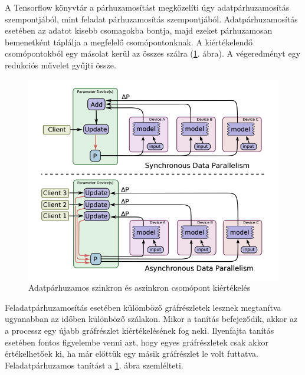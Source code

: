 \documentclass[12pt, a4paper, oneside]{book}
\theoremstyle{tetel}
\begin{document}
A Tensorflow könyvtár a párhuzamosítást megközelíti úgy adatpárhuzamosítás szempontjából, mint feladat párhuzamosítás szempontjából. Adatpárhuzamosítás esetében az adatot kisebb csomagokba bontja, majd ezeket párhuzamosan bemenetként táplálja a megfelelő csomópontonknak. A kiértékelendő csomópontokból egy másolat kerül az összes szálra (\ref{data_parallel_tf_model}. ábra). A végeredményt egy redukciós művelet gyűjti össze.

\begin{figure}[!htbp]
	\begin{center}
		\includegraphics[scale=0.5]{data_parallel_tf_model.png}
		\caption{Adatpárhuzamos szinkron és aszinkron csomópont kiértékelés\cite{35}}
		\label{data_parallel_tf_model}
	\end{center}
\end{figure}

Feladatpárhuzamosítás esetében külömböző gráfrészletek lesznek megtanítva ugyanabban az időben különböző szálakon. Mikor a tanítás befejeződik, akkor az a processz egy újabb gráfrészlet kiértékelésének fog neki. Ilyenfajta tanítás esetében fontos figyelembe venni azt, hogy egyes gráfrészletek csak akkor értékelhetőek ki, ha már előttük egy másik gráfrészlet le volt futtatva. Feladatpárhuzamos tanítást a \ref{data_parallel_tf_model}. ábra szemlélteti.
\end{document}
